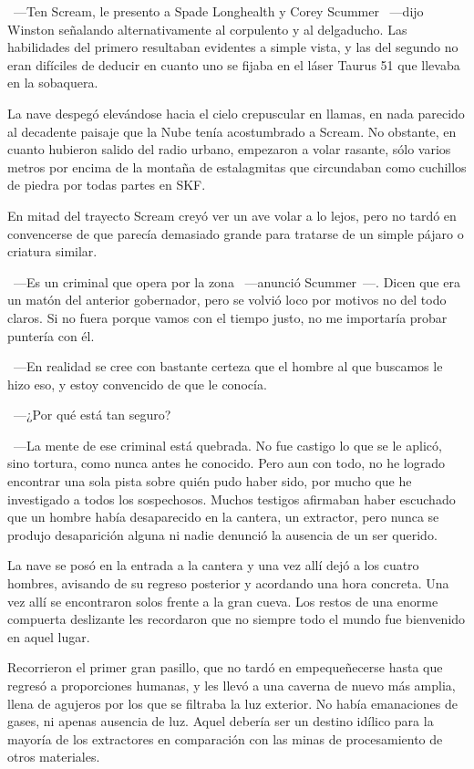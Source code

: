 ~---Ten Scream, le presento a Spade Longhealth y Corey Scummer ~---dijo Winston señalando alternativamente al corpulento y al delgaducho. Las habilidades del primero resultaban evidentes a simple vista, y las del segundo no eran difíciles de deducir en cuanto uno se fijaba en el láser Taurus 51 que llevaba en la sobaquera.

La nave despegó elevándose hacia el cielo crepuscular en llamas, en nada parecido al decadente paisaje que la Nube tenía acostumbrado a Scream. No obstante, en cuanto hubieron salido del radio urbano, empezaron a volar rasante, sólo varios metros por encima de la montaña de estalagmitas que circundaban como cuchillos de piedra por todas partes en SKF.

En mitad del trayecto Scream creyó ver un ave volar a lo lejos, pero no tardó en convencerse de que parecía demasiado grande para tratarse de un simple pájaro o criatura similar.

~---Es un criminal que opera por la zona ~---anunció Scummer~---. Dicen que era un matón del anterior gobernador, pero se volvió loco por motivos no del todo claros. Si no fuera porque vamos con el tiempo justo, no me importaría probar puntería con él.

~---En realidad se cree con bastante certeza que el hombre al que buscamos le hizo eso, y estoy convencido de que le conocía.

~---¿Por qué está tan seguro?

~---La mente de ese criminal está quebrada. No fue castigo lo que se le aplicó, sino tortura, como nunca antes he conocido. Pero aun con todo, no he logrado encontrar una sola pista sobre quién pudo haber sido, por mucho que he investigado a todos los sospechosos. Muchos testigos afirmaban haber escuchado que un hombre había desaparecido en la cantera, un extractor, pero nunca se produjo desaparición alguna ni nadie denunció la ausencia de un ser querido.

La nave se posó en la entrada a la cantera y una vez allí dejó a los cuatro hombres, avisando de su regreso posterior y acordando una hora concreta. Una vez allí se encontraron solos frente a la gran cueva. Los restos de una enorme compuerta deslizante les recordaron que no siempre todo el mundo fue bienvenido en aquel lugar.

Recorrieron el primer gran pasillo, que no tardó en empequeñecerse hasta que regresó a proporciones humanas, y les llevó a una caverna de nuevo más amplia, llena de agujeros por los que se filtraba la luz exterior. No había emanaciones de gases, ni apenas ausencia de luz. Aquel debería ser un destino idílico para la mayoría de los extractores en comparación con las minas de procesamiento de otros materiales.

